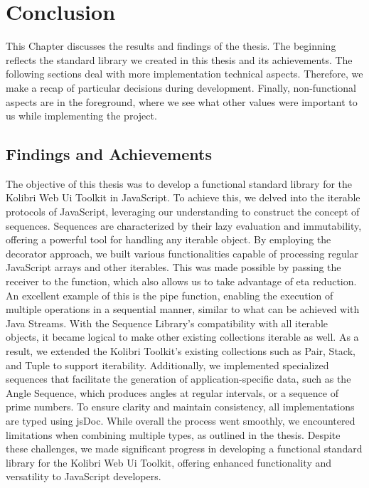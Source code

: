 \section{Conclusion}
\label{sec:conclusion}
This Chapter discusses the results and findings of the thesis. The beginning reflects the
standard library we created in this thesis and its achievements. The following
sections deal with more implementation technical aspects. Therefore, we make a
recap of particular decisions during development. Finally, non-functional
aspects are in the foreground, where we see what other values were important to
us while implementing the project.

\subsection{Findings and Achievements}
\label{sub:Findings and Achievements}
The objective of this thesis was to develop a functional standard library for
the Kolibri Web Ui Toolkit in JavaScript. To achieve this, we delved into the
iterable protocols of JavaScript, leveraging our understanding to construct the
concept of sequences. Sequences are characterized by their lazy evaluation and
immutability, offering a powerful tool for handling any iterable object. By
employing the decorator approach, we built various functionalities capable of
processing regular JavaScript arrays and other iterables. This was made
possible by passing the receiver to the function, which also allows us to take
advantage of eta reduction.
\newline
An excellent example of this is the pipe function, enabling the execution of
multiple operations in a sequential manner, similar to what can be achieved
with Java Streams. With the Sequence Library's compatibility with all iterable
objects, it became logical to make other existing collections iterable as well.
As a result, we extended the Kolibri Toolkit's existing collections such as
Pair, Stack, and Tuple to support iterability. Additionally, we implemented
specialized sequences that facilitate the generation of application-specific
data, such as the Angle Sequence, which produces angles at regular intervals,
or a sequence of prime numbers.
\newline
To ensure clarity and maintain consistency, all implementations are typed using
jsDoc. While overall the process went smoothly, we encountered limitations when
combining multiple types, as outlined in the thesis. Despite these challenges,
we made significant progress in developing a functional standard library for
the Kolibri Web Ui Toolkit, offering enhanced functionality and versatility to
JavaScript developers.

